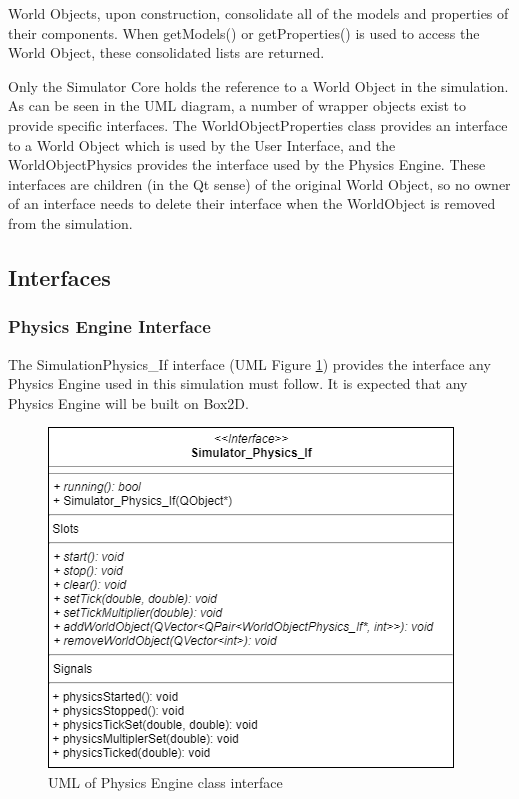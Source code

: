 	World Objects, upon construction, consolidate all of the models and properties of their components. When getModels() or getProperties() is used to access the World Object, these consolidated lists are returned.

	Only the Simulator Core holds the reference to a World Object in the simulation. As can be seen in the UML diagram, a number of wrapper objects exist to provide specific interfaces. The WorldObjectProperties class provides an interface to a World Object which is used by the User Interface, and the WorldObjectPhysics provides the interface used by the Physics Engine. These interfaces are children (in the Qt sense) of the original World Object, so no owner of an interface needs to delete their interface when the WorldObject is removed from the simulation.
  
  \subsection{Interfaces}
  \subsubsection*{Physics Engine Interface}
  The SimulationPhysics\_If interface (UML Figure \ref{uml:phys_if}) provides the interface any Physics Engine used in this simulation must follow. It is expected that any Physics Engine will be built on Box2D.
  
 \begin{figure}[h]
 	\begin{center}
 	\includegraphics[scale=0.5]{./images_design/uml/Physics_Engine_If}
 	\caption{UML of Physics Engine class interface\label{uml:phys_if}}
 	\end{center}
 \end{figure}  
  
